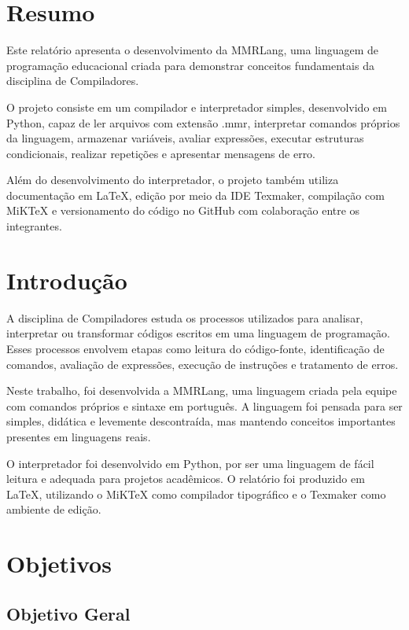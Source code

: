 \documentclass[12pt,a4paper]{article}
\begin{document}
\section{Resumo}

Este relatório apresenta o desenvolvimento da MMRLang, uma linguagem de programação educacional criada para demonstrar conceitos fundamentais da disciplina de Compiladores.

O projeto consiste em um compilador e interpretador simples, desenvolvido em Python, capaz de ler arquivos com extensão .mmr, interpretar comandos próprios da linguagem, armazenar variáveis, avaliar expressões, executar estruturas condicionais, realizar repetições e apresentar mensagens de erro.

Além do desenvolvimento do interpretador, o projeto também utiliza documentação em LaTeX, edição por meio da IDE Texmaker, compilação com MiKTeX e versionamento do código no GitHub com colaboração entre os integrantes.

\section{Introdução}

A disciplina de Compiladores estuda os processos utilizados para analisar, interpretar ou transformar códigos escritos em uma linguagem de programação. Esses processos envolvem etapas como leitura do código-fonte, identificação de comandos, avaliação de expressões, execução de instruções e tratamento de erros.

Neste trabalho, foi desenvolvida a MMRLang, uma linguagem criada pela equipe com comandos próprios e sintaxe em português. A linguagem foi pensada para ser simples, didática e levemente descontraída, mas mantendo conceitos importantes presentes em linguagens reais.

O interpretador foi desenvolvido em Python, por ser uma linguagem de fácil leitura e adequada para projetos acadêmicos. O relatório foi produzido em LaTeX, utilizando o MiKTeX como compilador tipográfico e o Texmaker como ambiente de edição.

\section{Objetivos}

\subsection{Objetivo Geral}
\end{document}
